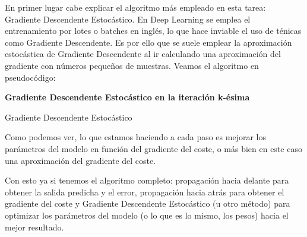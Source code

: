 En primer lugar cabe explicar el algoritmo más empleado en esta tarea: Gradiente Descendente Estocástico. En Deep Learning se emplea el entrenamiento por lotes o batches en inglés, lo que hace inviable el uso de ténicas como Gradiente Descendente. Es por ello que se suele emplear la aproximación estocástica de Gradiente Descendente al ir calculando una aproximación del gradiente con números pequeños de muestras. Veamos el algoritmo en pseudocódigo:

\begin{algorithm}[H]{\Large{\textbf{Gradiente Descendente Estocástico en la iteración k-ésima}}}
	
	\vspace{15px}
	
	\caption{Gradiente Descendente Estocástico}
	\label{alg:sgd}
	
	\vspace{10px}
	
	
	\vspace{10px}
	
	
	\vspace{5px}
\end{algorithm}

Como podemos ver, lo que estamos haciendo a cada paso es mejorar los parámetros del modelo en función del gradiente del coste, o más bien en este caso una aproximación del gradiente del coste. 

Con esto ya si tenemos el algoritmo completo: propagación hacia delante para obtener la salida predicha y el error, propagación hacia atrás para obtener el gradiente del coste y Gradiente Descendente Estocástico (u otro método) para optimizar los parámetros del modelo (o lo que es lo mismo, los pesos) hacia el mejor resultado.

